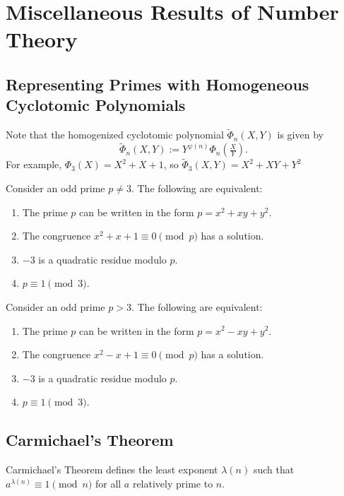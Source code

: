 \chapter{Miscellaneous Results of Number Theory}

\section{Representing Primes with Homogeneous Cyclotomic Polynomials}

Note that the homogenized cyclotomic polynomial $\tilde{\Phi}_n(X,Y)$ is given by
\begin{equation*}
  \tilde{\Phi}_n(X,Y):= Y^{\varphi(n)}\Phi_n(\tfrac{X}{Y}).
\end{equation*}
For example, $\Phi_3(X) = X^2+X+1$, so $\tilde{\Phi}_3(X,Y) = X^2+XY+Y^2$

\begin{theorem}
  Consider an odd prime $p\neq 3$. The following are equivalent:
  \begin{enumerate}
  \item The prime $p$ can be written in the form $p=x^2+xy+y^2$.
  \item The congruence $x^2+x+1\equiv 0\pmod{p}$ has a solution.
  \item $-3$ is a quadratic residue modulo $p$.
  \item $p\equiv 1\pmod{3}$.
  \end{enumerate}
\end{theorem}

\begin{theorem}
  Consider an odd prime $p>3$. The following are equivalent:
  \begin{enumerate}
  \item The prime $p$ can be written in the form $p=x^2-xy+y^2$.
  \item The congruence $x^2-x+1\equiv 0\pmod{p}$ has a solution.
  \item $-3$ is a quadratic residue modulo $p$.
  \item $p\equiv 1\pmod{3}$.
  \end{enumerate}  
\end{theorem}

\section{Carmichael's Theorem}

Carmichael's Theorem defines the least exponent $\lambda(n)$ such that $a^{\lambda(n)}\equiv 1\pmod{n}$ for all $a$ relatively prime to $n$.

